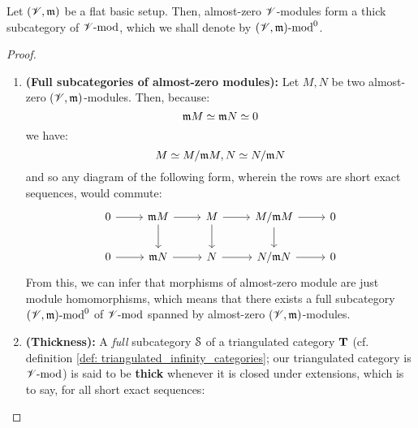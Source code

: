                     \begin{proposition} \label{prop: thick_subcategories_of_almost_zero_modules}
                        Let $(\scrV, \m)$ be a flat basic setup. Then, almost-zero $\scrV$-modules form a thick subcategory of $\scrV\mod$, which we shall denote by $(\scrV, \m)\mod^0$.
                    \end{proposition}
                        \begin{proof}
                            \noindent
                            \begin{enumerate}
                                \item \textbf{(Full subcategories of almost-zero modules):} Let $M, N$ be two almost-zero $(\scrV, \m)$-modules. Then, because:
                                    $$\m M \cong \m N \cong 0$$
                                we have:
                                    $$M \cong M/\m M, N \cong N/\m N$$
                                and so any diagram of the following form, wherein the rows are short exact sequences, would commute:
                                    $$
                                        \begin{tikzcd}
                                        	0 & {\m M} & M & {M/\m M} & 0 \\
                                        	0 & {\m N} & N & {N/ \m N} & 0
                                        	\arrow[from=1-1, to=1-2]
                                        	\arrow[from=1-2, to=1-3]
                                        	\arrow[from=1-3, to=1-4]
                                        	\arrow[from=1-4, to=1-5]
                                        	\arrow[from=2-1, to=2-2]
                                        	\arrow[from=2-2, to=2-3]
                                        	\arrow[from=2-3, to=2-4]
                                        	\arrow[from=2-4, to=2-5]
                                        	\arrow[from=1-2, to=2-2]
                                        	\arrow[from=1-3, to=2-3]
                                        	\arrow[from=1-4, to=2-4]
                                        \end{tikzcd}
                                    $$
                                From this, we can infer that morphisms of almost-zero module are just module homomorphisms, which means that there exists a full subcategory $(\scrV, \m)\mod^0$ of $\scrV\mod$ spanned by almost-zero $(\scrV, \m)$-modules.
                                \item \textbf{(Thickness):} A \textit{full} subcategory $\S$ of a triangulated category $\T$ (cf. definition \ref{def: triangulated_infinity_categories}; our triangulated category is $\scrV\mod$) is said to be \textbf{thick} whenever it is closed under extensions, which is to say, for all short exact sequences:

\end{enumerate}
\end{proof}
